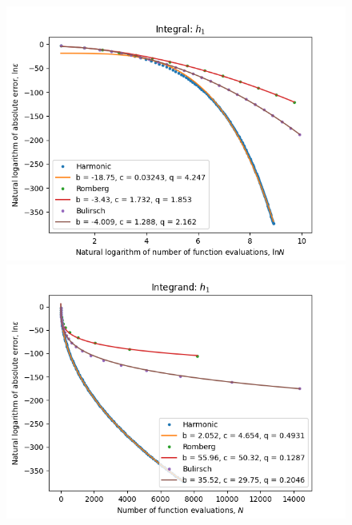 \begin{figure}[H]
\centering
\begin{minipage}{0.45\textwidth}
\centering
\includegraphics[scale=0.45]{romberg_plots/h_one_hp_log_log_pow_fit_trend.png}
\end{minipage}
\begin{minipage}{0.45\textwidth}
\centering
\includegraphics[scale=0.45]{romberg_plots/h_one_hp_trend.png}
\end{minipage}
\end{figure}

